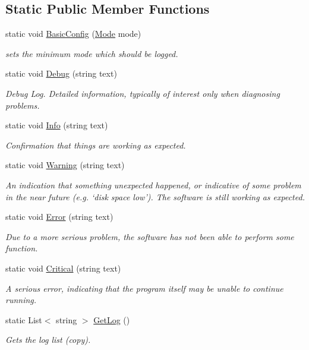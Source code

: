 \subsection*{Static Public Member Functions}
\begin{DoxyCompactItemize}
\item 
static void \hyperlink{classCore_1_1Helper_1_1Logging_ae3a82ba60e51f23097b39147df4f0927}{Basic\+Config} (\hyperlink{classCore_1_1Helper_1_1Logging_aff45583600750b779f0cc9fc5a63a27e}{Mode} mode)
\begin{DoxyCompactList}\small\item\em sets the minimum mode which should be logged. \end{DoxyCompactList}\item 
static void \hyperlink{classCore_1_1Helper_1_1Logging_a36c75ee2aabd978c354e7ad77b234118}{Debug} (string text)
\begin{DoxyCompactList}\small\item\em Debug Log. Detailed information, typically of interest only when diagnosing problems. \end{DoxyCompactList}\item 
static void \hyperlink{classCore_1_1Helper_1_1Logging_a361a56a134f94f27594469dbc5bf3e8e}{Info} (string text)
\begin{DoxyCompactList}\small\item\em Confirmation that things are working as expected. \end{DoxyCompactList}\item 
static void \hyperlink{classCore_1_1Helper_1_1Logging_ab348365b61c0d138d57ec6a2f9d395b6}{Warning} (string text)
\begin{DoxyCompactList}\small\item\em An indication that something unexpected happened, or indicative of some problem in the near future (e.\+g. ‘disk space low’). The software is still working as expected. \end{DoxyCompactList}\item 
static void \hyperlink{classCore_1_1Helper_1_1Logging_aae6f1ab92c199c6b55c3038134ea789e}{Error} (string text)
\begin{DoxyCompactList}\small\item\em Due to a more serious problem, the software has not been able to perform some function. \end{DoxyCompactList}\item 
static void \hyperlink{classCore_1_1Helper_1_1Logging_a7f38362db8ed2e6ef4b8682a0559a31a}{Critical} (string text)
\begin{DoxyCompactList}\small\item\em A serious error, indicating that the program itself may be unable to continue running. \end{DoxyCompactList}\item 
static List$<$ string $>$ \hyperlink{classCore_1_1Helper_1_1Logging_a68c97fa4b1d8f737d0b7f5f58e86a9f1}{Get\+Log} ()
\begin{DoxyCompactList}\small\item\em Gets the log list (copy). \end{DoxyCompactList}\end{DoxyCompactItemize}


